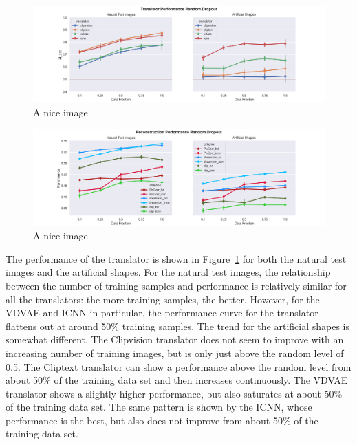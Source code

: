 
\begin{figure}[ht]
    \centering
    \includegraphics[width=1\textwidth]{plots/dropout_random_translator.png}
    \caption{A nice image}\label{fig:dropout_random_translator}
\end{figure}

\begin{figure}[ht]
    \centering
    \includegraphics[width=1\textwidth]{plots/dropout_random_reconstruction.png}
    \caption{A nice image}\label{fig:dropout_random_reconstruction}
\end{figure}

The performance of the translator is shown in Figure~\ref{fig:dropout_random_translator} for both the natural test images and the artificial shapes. For the natural test images, the relationship between the number of training samples and performance is relatively similar for all the translators: the more training samples, the better. However, for the VDVAE and ICNN in particular, the performance curve for the translator flattens out at around 50\% training samples. The trend for the artificial shapes is somewhat different. The Clipvision translator does not seem to improve with an increasing number of training images, but is only just above the random level of 0.5. The Cliptext translator can show a performance above the random level from about 50\% of the training data set and then increases continuously. The VDVAE translator shows a slightly higher performance, but also saturates at about 50\% of the training data set. The same pattern is shown by the ICNN, whose performance is the best, but also does not improve from about 50\% of the training data set. 

